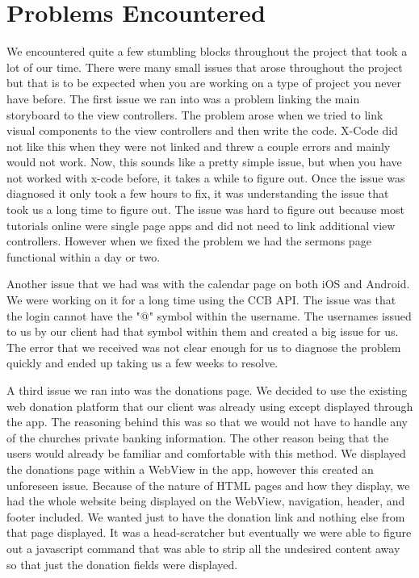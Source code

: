 \documentclass[letterpaper,10pt,draftclsnofoot,onecolumn,titlepage]{IEEEtran}
\begin{document}
\section{Problems Encountered}
		We encountered quite a few stumbling blocks throughout the project that took a lot of our time. 
		There were many small issues that arose throughout the project but that is to be expected when you are working on a type of project you never have before.
		The first issue we ran into was a problem linking the main storyboard to the view controllers. 
		The problem arose when we tried to link visual components to the view controllers and then write the code.
		X-Code did not like this when they were not linked and threw a couple errors and mainly would not work.
		Now, this sounds like a pretty simple issue, but when you have not worked with x-code before, it takes a while to figure out.
		Once the issue was diagnosed it only took a few hours to fix, it was understanding the issue that took us a long time to figure out.
		The issue was hard to figure out because most tutorials online were single page apps and did not need to link additional view controllers.
		However when we fixed the problem we had the sermons page functional within a day or two.

		Another issue that we had was with the calendar page on both iOS and Android.
		We were working on it for a long time using the CCB API.
		The issue was that the login cannot have the "@" symbol within the username.
		The usernames issued to us by our client had that symbol within them and created a big issue for us.
		The error that we received was not clear enough for us to diagnose the problem quickly and ended up taking us a few weeks to resolve.

		A third issue we ran into was the donations page.
		We decided to use the existing web donation platform that our client was already using except displayed through the app.
		The reasoning behind this was so that we would not have to handle any of the churches private banking information.
		The other reason being that the users would already be familiar and comfortable with this method.
		We displayed the donations page within a WebView in the app, however this created an unforeseen issue. 
		Because of the nature of HTML pages and how they display, we had the whole website being displayed on the WebView, navigation, header, and footer included.
		We wanted just to have the donation link and nothing else from that page displayed.
		It was a head-scratcher but eventually we were able to figure out a javascript command that was able to strip all the undesired content away so that just the donation fields were displayed.
\end{document}
